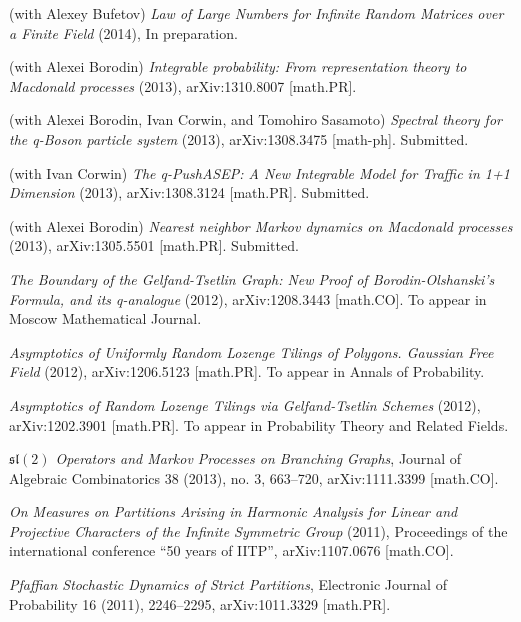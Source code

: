 \documentclass[letterpaper,11pt]{article}
\begin{document}
\begin{etaremune}
    \renewcommand{\labelenumi}{[\theenumi]}
    \item (with Alexey Bufetov)
    \emph{Law of Large Numbers for Infinite Random Matrices over a Finite Field} (2014), In preparation.
    \item (with Alexei Borodin) 
    \emph{Integrable probability: From representation theory to Macdonald processes}
    (2013), arXiv:1310.8007 [math.PR].
    \item (with Alexei Borodin, Ivan Corwin, and Tomohiro Sasamoto)
    \emph{Spectral theory for the q-Boson particle system}
    (2013), arXiv:1308.3475 [math-ph]. Submitted.
    \item (with Ivan Corwin)
    \emph{The q-PushASEP: A New Integrable Model for Traffic in 1+1 Dimension} (2013), arXiv:1308.3124 [math.PR]. 
    Submitted.
    \item (with Alexei Borodin) 
    \emph{Nearest neighbor Markov dynamics on Macdonald processes} (2013), 
    arXiv:1305.5501 [math.PR].
    Submitted.
    \item \emph{The Boundary of the Gelfand-Tsetlin Graph: New Proof of Borodin-Olshanski's Formula, and its q-analogue} (2012),  arXiv:1208.3443 [math.CO]. To appear in Moscow Mathematical Journal.
    \item \emph{Asymptotics of Uniformly Random Lozenge Tilings of Polygons. Gaussian Free Field} (2012), arXiv:1206.5123 [math.PR]. To appear in Annals of Probability.
    \item \emph{Asymptotics of Random Lozenge Tilings via Gelfand-Tsetlin Schemes} (2012), arXiv:1202.3901 [math.PR]. To
    appear in Probability Theory and Related Fields.
    \item \emph{$\mathfrak{sl}(2)$ Operators and Markov Processes on Branching Graphs},
    Journal of Algebraic Combinatorics 38 (2013), no. 3, 663--720,
    arXiv:1111.3399 [math.CO].
    \item \emph{On Measures on Partitions Arising in Harmonic Analysis for Linear and Projective Characters of the Infinite Symmetric Group} (2011), Proceedings of the international conference ``50 years of IITP'', arXiv:1107.0676 [math.CO].
    \item  \emph{Pfaffian Stochastic Dynamics of Strict Partitions},  Electronic Journal of Probability 16 (2011), 2246--2295, arXiv:1011.3329 [math.PR].

\end{etaremune}
\end{document}
